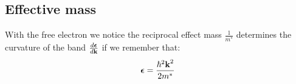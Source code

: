 		\subsection{Effective mass}
			With the free electron we notice the reciprocal effect mass $\frac{1}{m^*}$ determines the curvature of the band $\frac{d\boldsymbol{\epsilon}}{d\textrm{\textbf{k}}}$ if we remember that:
			\begin{equation}
				\boldsymbol{\epsilon} = \frac{\hbar^2 \textrm{\textbf{k}}^2}{2m^*}
			\end{equation}
			
			